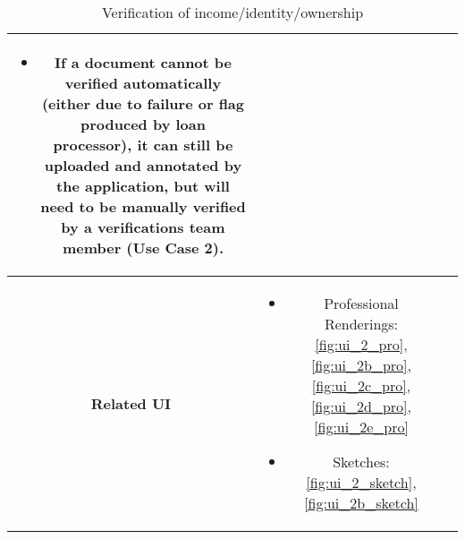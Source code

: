 \begin{table}[H]
\begin{tabularx}{0.75\linewidth}{||Sc|X||}
\begin{minipage}[l]{\linewidth}
            \begin{itemize}[wide, labelindent=0pt]
                \item If a document cannot be verified automatically (either due to failure or flag produced by loan processor), it can still be uploaded and annotated by the application, but will need to be manually verified by a verifications team member (Use Case 2).
            \end{itemize}
        \end{minipage} \\
        \hline
        \textbf{Related UI} &
        \begin{minipage}[l]{\linewidth}
            \begin{itemize}[wide, labelindent=0pt]
                \vspace{4pt}
                \item Professional Renderings: \ref{fig:ui_2_pro}, \ref{fig:ui_2b_pro}, \ref{fig:ui_2c_pro}, \ref{fig:ui_2d_pro}, \ref{fig:ui_2e_pro}
                \item Sketches: \ref{fig:ui_2_sketch}, \ref{fig:ui_2b_sketch}
                \vspace{4pt}
            \end{itemize}
        \end{minipage} \\
        \hline
        \hline
    \end{tabularx}
    \caption{Verification of income/identity/ownership}
    \label{tab:use_case_verification}
\end{table}
    

